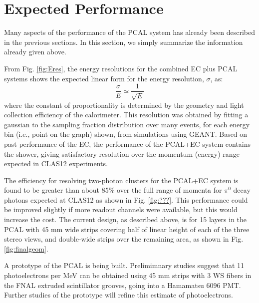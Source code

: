 \section{ Expected Performance }

Many aspects of the performance of the PCAL system has already 
been described in the previous sections.  In this section, we 
simply summarize the information already given above. 

From Fig. \ref{fig:Eres}, the energy resolutions for the 
combined EC plus PCAL systems shows the expected linear 
form for the energy resolution, $\sigma$, as:
\begin{equation}
  \frac{\sigma}{E} \simeq \frac{1}{\sqrt{E}}
\end{equation}
where the constant of proportionality is determined by the 
geometry and light collection efficiency of the calorimeter. 
This resolution was obtained by fitting a gaussian to the 
sampling fraction distribution over many events, for each 
energy bin (i.e., point on the graph) shown, from simulations 
using GEANT.  Based on past performance of the EC, the 
performance of the PCAL+EC system contains the shower, 
giving satisfactory resolution over the momentum (energy) 
range expected in CLAS12 experiments.

The efficiency for resolving two-photon clusters for the 
PCAL+EC system is found to be greater than about 85\% over 
the full range of momenta for $\pi^0$ decay photons 
expected at CLAS12 as shown in Fig. \ref{fig:???}.  
This performance could be improved 
slightly if more readout channels were available, but 
this would increase the cost.  The current design, as 
described above, is for 15 layers in the PCAL with 
45 mm wide strips covering half of linear height of each 
of the three stereo views, and double-wide strips over the 
remaining area, as shown in Fig. \ref{fig:finalgeom}. 

A prototype of the PCAL is being built.  Prelimimnary 
studies suggest that 11 photoelectrons per MeV can 
be obtained using 45 mm strips with 3 WS fibers in 
the FNAL extruded scintillator grooves, going into 
a Hamamatsu 6096 PMT.  Further studies of the prototype 
will refine this estimate of photoelectrons.

